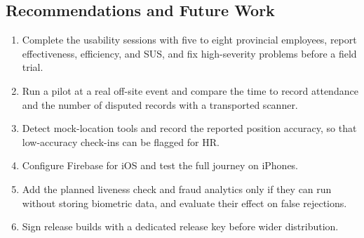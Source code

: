 \documentclass[conference]{IEEEtran}
\begin{document}
\subsection{Recommendations and Future Work}

\begin{enumerate}
    \item Complete the usability sessions with five to eight provincial
    employees, report effectiveness, efficiency, and SUS, and fix
    high-severity problems before a field trial.
    \item Run a pilot at a real off-site event and compare the time to
    record attendance and the number of disputed records with a
    transported scanner.
    \item Detect mock-location tools and record the reported position
    accuracy, so that low-accuracy check-ins can be flagged for HR.
    \item Configure Firebase for iOS and test the full journey on
    iPhones.
    \item Add the planned liveness check and fraud analytics only if
    they can run without storing biometric data, and evaluate their
    effect on false rejections.
    \item Sign release builds with a dedicated release key before wider
    distribution.
\end{enumerate}


\printbibliography
\end{document}
